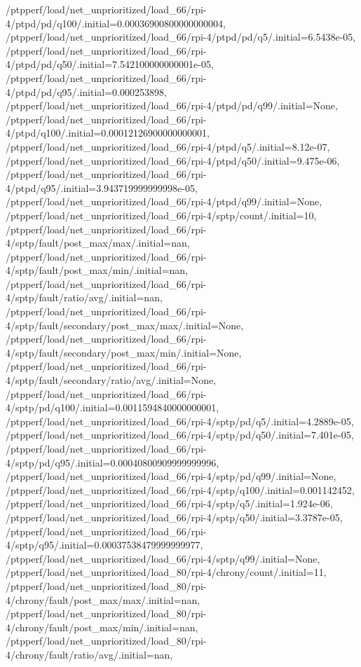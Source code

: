 {    /ptpperf/load/net_unprioritized/load_66/rpi-4/ptpd/pd/q100/.initial=0.00036900800000000004,
    /ptpperf/load/net_unprioritized/load_66/rpi-4/ptpd/pd/q5/.initial=6.5438e-05,
    /ptpperf/load/net_unprioritized/load_66/rpi-4/ptpd/pd/q50/.initial=7.542100000000001e-05,
    /ptpperf/load/net_unprioritized/load_66/rpi-4/ptpd/pd/q95/.initial=0.000253898,
    /ptpperf/load/net_unprioritized/load_66/rpi-4/ptpd/pd/q99/.initial=None,
    /ptpperf/load/net_unprioritized/load_66/rpi-4/ptpd/q100/.initial=0.00012126900000000001,
    /ptpperf/load/net_unprioritized/load_66/rpi-4/ptpd/q5/.initial=8.12e-07,
    /ptpperf/load/net_unprioritized/load_66/rpi-4/ptpd/q50/.initial=9.475e-06,
    /ptpperf/load/net_unprioritized/load_66/rpi-4/ptpd/q95/.initial=3.943719999999998e-05,
    /ptpperf/load/net_unprioritized/load_66/rpi-4/ptpd/q99/.initial=None,
    /ptpperf/load/net_unprioritized/load_66/rpi-4/sptp/count/.initial=10,
    /ptpperf/load/net_unprioritized/load_66/rpi-4/sptp/fault/post_max/max/.initial=nan,
    /ptpperf/load/net_unprioritized/load_66/rpi-4/sptp/fault/post_max/min/.initial=nan,
    /ptpperf/load/net_unprioritized/load_66/rpi-4/sptp/fault/ratio/avg/.initial=nan,
    /ptpperf/load/net_unprioritized/load_66/rpi-4/sptp/fault/secondary/post_max/max/.initial=None,
    /ptpperf/load/net_unprioritized/load_66/rpi-4/sptp/fault/secondary/post_max/min/.initial=None,
    /ptpperf/load/net_unprioritized/load_66/rpi-4/sptp/fault/secondary/ratio/avg/.initial=None,
    /ptpperf/load/net_unprioritized/load_66/rpi-4/sptp/pd/q100/.initial=0.0011594840000000001,
    /ptpperf/load/net_unprioritized/load_66/rpi-4/sptp/pd/q5/.initial=4.2889e-05,
    /ptpperf/load/net_unprioritized/load_66/rpi-4/sptp/pd/q50/.initial=7.401e-05,
    /ptpperf/load/net_unprioritized/load_66/rpi-4/sptp/pd/q95/.initial=0.00040800909999999996,
    /ptpperf/load/net_unprioritized/load_66/rpi-4/sptp/pd/q99/.initial=None,
    /ptpperf/load/net_unprioritized/load_66/rpi-4/sptp/q100/.initial=0.001142452,
    /ptpperf/load/net_unprioritized/load_66/rpi-4/sptp/q5/.initial=1.924e-06,
    /ptpperf/load/net_unprioritized/load_66/rpi-4/sptp/q50/.initial=3.3787e-05,
    /ptpperf/load/net_unprioritized/load_66/rpi-4/sptp/q95/.initial=0.00037538479999999977,
    /ptpperf/load/net_unprioritized/load_66/rpi-4/sptp/q99/.initial=None,
    /ptpperf/load/net_unprioritized/load_80/rpi-4/chrony/count/.initial=11,
    /ptpperf/load/net_unprioritized/load_80/rpi-4/chrony/fault/post_max/max/.initial=nan,
    /ptpperf/load/net_unprioritized/load_80/rpi-4/chrony/fault/post_max/min/.initial=nan,
    /ptpperf/load/net_unprioritized/load_80/rpi-4/chrony/fault/ratio/avg/.initial=nan,
}
